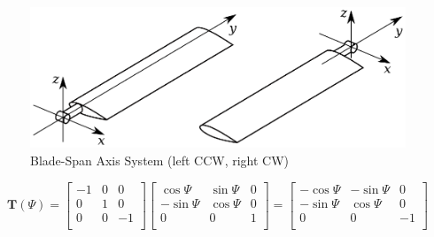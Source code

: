 \begin{figure}
  \centering
  \includegraphics[width=130mm]{eps/coordinate_system_BSAS.eps}
  \caption{Blade-Span Axis System (left CCW, right CW)}
\end{figure}

\begin{equation}
  \boldsymbol T \left( \Psi \right)
  =
  \left[
    \begin{matrix}
      -1 & 0 &  0 \\
       0 & 1 &  0 \\
       0 & 0 & -1 \\
    \end{matrix}
  \right]
  \left[
    \begin{matrix}
       \cos \Psi & \sin \Psi & 0 \\
      -\sin \Psi & \cos \Psi & 0 \\
               0 &         0 & 1 \\
    \end{matrix}
  \right]
  =
  \left[
    \begin{matrix}
      -\cos \Psi & -\sin \Psi &  0 \\
      -\sin \Psi &  \cos \Psi &  0 \\
               0 &          0 & -1 \\
    \end{matrix}
  \right]
\end{equation}
